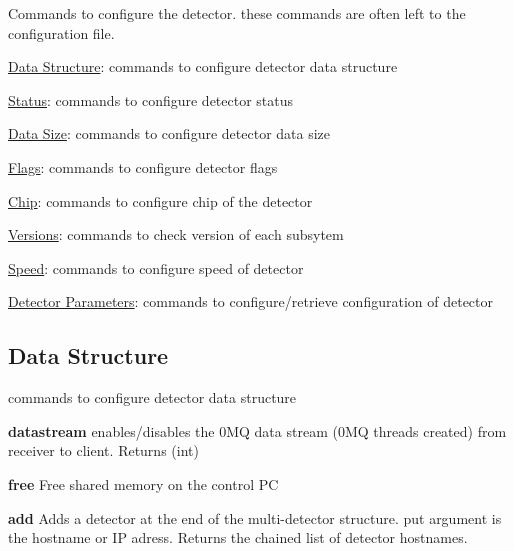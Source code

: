 Commands to configure the detector. these commands are often left to the configuration file.
\begin{DoxyItemize}
\item \hyperlink{config_configstructure}{Data Structure}: commands to configure detector data structure
\item \hyperlink{config_configstatus}{Status}: commands to configure detector status
\item \hyperlink{config_configsize}{Data Size}: commands to configure detector data size
\item \hyperlink{config_configflags}{Flags}: commands to configure detector flags
\item \hyperlink{config_configchip}{Chip}: commands to configure chip of the detector
\item \hyperlink{config_configversions}{Versions}: commands to check version of each subsytem
\item \hyperlink{config_configspeed}{Speed}: commands to configure speed of detector
\item \hyperlink{config_configsettings}{Detector Parameters}: commands to configure/retrieve configuration of detector
\end{DoxyItemize}\hypertarget{config_configstructure}{}\subsection{Data Structure}\label{config_configstructure}
commands to configure detector data structure


\begin{DoxyItemize}
\item {\bfseries  datastream }enables/disables the 0MQ data stream (0MQ threads created) from receiver to client. {\ttfamily Returns} {\ttfamily }(int)
\end{DoxyItemize}


\begin{DoxyItemize}
\item {\bfseries free} Free shared memory on the control PC
\end{DoxyItemize}


\begin{DoxyItemize}
\item {\bfseries add} Adds a detector at the end of the multi-\/detector structure. {\ttfamily put} argument is the hostname or IP adress. Returns the chained list of detector hostnames.
\end{DoxyItemize}


